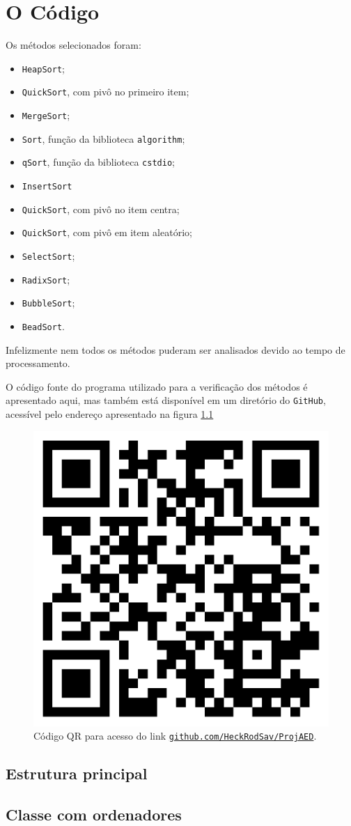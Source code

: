 \documentclass[12pt,twoside]{report}
\begin{document}
	\chapter{O Código}
	
	Os métodos selecionados foram:
	
	\begin{itemize}
		\item \lstinline|HeapSort|;
		\item \lstinline|QuickSort|, com pivô no primeiro item;
		\item \lstinline|MergeSort|;
		\item \lstinline|Sort|, função da biblioteca \lstinline|algorithm|;
		\item \lstinline|qSort|, função da biblioteca \lstinline|cstdio|;
		\item \lstinline|InsertSort|
		\item \lstinline|QuickSort|, com pivô no item centra;
		\item \lstinline|QuickSort|, com pivô em item aleatório;
		\item \lstinline|SelectSort|;
		\item \lstinline|RadixSort|;
		\item \lstinline|BubbleSort|;
		\item \lstinline|BeadSort|.
	\end{itemize}

	Infelizmente nem todos os métodos puderam ser analisados devido ao tempo de processamento.
	
	O código fonte do programa utilizado para a verificação dos métodos é apresentado aqui, mas também está disponível em um diretório do \lstinline|GitHub|, acessível pelo endereço apresentado na figura \ref{QR}

	\begin{figure}[!h]
		\begin{center}
			\includegraphics[width=.5\textwidth]{../QR.png}
			\caption{Código QR para acesso do link \href{	https://github.com/HeckRodSav/ProjAED}{\lstinline|github.com/HeckRodSav/ProjAED|}.}
			\label {QR}
		\end{center}
	\end{figure}
	
	
	\section{Estrutura principal}
	
	
	
	\section{Classe com ordenadores}

	
	
	
\end{document}
